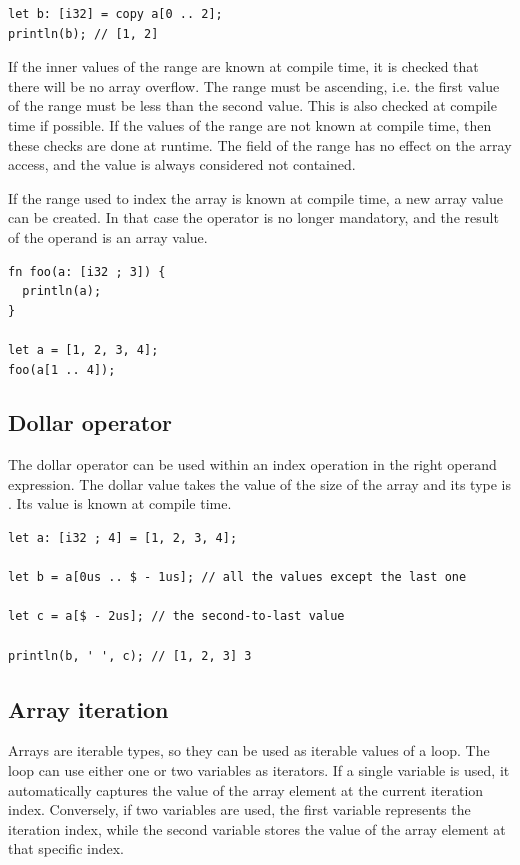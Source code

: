 \begin{itemize}
\begin{lstlisting}[style=coloredverbatim]
let b: [i32] = copy a[0 .. 2];
println(b); // [1, 2]
  \end{lstlisting}

  If the inner values of the range are known at compile time, it is checked that
  there will be no array overflow. The range must be ascending, i.e. the first
  value of the range must be less than the second value. This is also checked at
  compile time if possible. If the values of the range are not known at compile
  time, then these checks are done at runtime. The  field of the range
  has no effect on the array access, and the  value is always
  considered not contained.

  If the range used to index the array is known at compile time, a new array
  value can be created. In that case the  operator is no longer
  mandatory, and the result of the operand is an array value.

  \begin{lstlisting}[style=coloredverbatim]
fn foo(a: [i32 ; 3]) {
  println(a);
}

let a = [1, 2, 3, 4];
foo(a[1 .. 4]);
  \end{lstlisting}

\end{itemize}

\subsection {Dollar operator}

The dollar operator can be used within an index operation in the right operand
expression. The dollar value takes the value of the size of the array and its
type is . Its value is known at compile time.

\begin{lstlisting}[style=coloredverbatim]
let a: [i32 ; 4] = [1, 2, 3, 4];

let b = a[0us .. $ - 1us]; // all the values except the last one

let c = a[$ - 2us]; // the second-to-last value

println(b, ' ', c); // [1, 2, 3] 3
\end{lstlisting}

\subsection {Array iteration}

Arrays are iterable types, so they can be used as iterable values of a
 loop. The  loop can use either one or two variables as
iterators. If a single variable is used, it automatically captures the value of
the array element at the current iteration index. Conversely, if two variables
are used, the first variable represents the iteration index, while the second
variable stores the value of the array element at that specific index.

